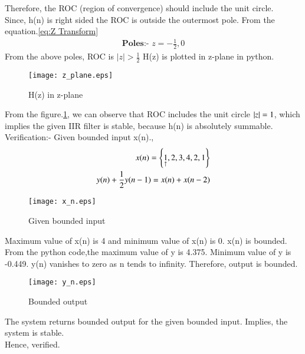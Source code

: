 \documentclass[journal,12pt,twocolumn]{IEEEtran}
\begin{document}
Therefore, the ROC (region of convergence) should include the unit circle.\\
Since, h(n) is right sided the ROC is outside the outermost pole.
From the equation.\ref{eq:Z Transform}
\begin{align}
    \textbf{Poles:- } z = -\frac{1}{2},0
\end{align}
From the above poles, ROC is $|z|>\frac{1}{2}$
H(z) is plotted in z-plane in python.
\begin{figure}[h!]
    \centering
    \texttt{[image: z\_plane.eps]}
    \caption{H(z) in z-plane}
    \label{Z_plane analysis}
\end{figure}
From the figure.\ref{Z_plane analysis}, we can observe that ROC includes the unit circle $\left\vert z\right\vert = 1$, which implies the given IIR filter is stable, because h(n) is absolutely summable.\\
Verification:- Given bounded input x(n).,
\begin{align}
    x(n) = \left\{\underset{\uparrow}{1},2,3,4,2,1\right\}\\
    y(n)+\frac{1}{2}y(n-1) = x(n)+x(n-2)
\end{align}
\begin{figure}[h!]
    \centering
    \texttt{[image: x\_n.eps]}
    \caption{Given bounded input}
    \label{xn}
\end{figure}
Maximum value of x(n) is 4 and minimum value of x(n) is
0. x(n) is bounded.\\
From the python code,the maximum value of y is 4.375. Minimum value of y is -0.449. y(n) vanishes to zero as n tends to infinity. Therefore, output is bounded.\\
\begin{figure}[h!]
    \centering
    \texttt{[image: y\_n.eps]}
    \caption{Bounded output}
    \label{yn}
\end{figure}
The system returns bounded output for the given bounded input. Implies, the system is stable.\\ Hence, verified.
\end{document}
